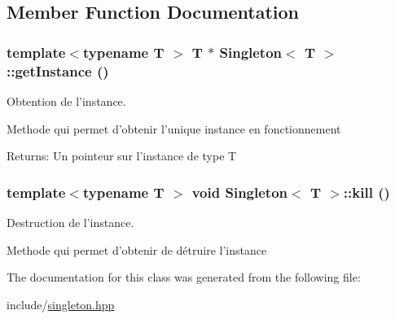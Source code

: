 \subsection{Member Function Documentation}
\hypertarget{classSingleton_c7b8bd773889a70952cd00654e43bbe8}{
\subsubsection[{getInstance}]{\setlength{\rightskip}{0pt plus 5cm}template$<$typename T $>$ T $\ast$ {\bf Singleton}$<$ T $>$::getInstance ()}}
\label{classSingleton_c7b8bd773889a70952cd00654e43bbe8}


Obtention de l'instance. 

Methode qui permet d'obtenir l'unique instance en fonctionnement

\begin{Desc}
\item[Returns:]Un pointeur sur l'instance de type T \end{Desc}
\hypertarget{classSingleton_a0372324492d74974b014b8d576737f3}{
\subsubsection[{kill}]{\setlength{\rightskip}{0pt plus 5cm}template$<$typename T $>$ void {\bf Singleton}$<$ T $>$::kill ()}}
\label{classSingleton_a0372324492d74974b014b8d576737f3}


Destruction de l'instance. 

Methode qui permet d'obtenir de détruire l'instance 

The documentation for this class was generated from the following file:\begin{CompactItemize}
\item 
include/\hyperlink{singleton_8hpp}{singleton.hpp}\end{CompactItemize}
